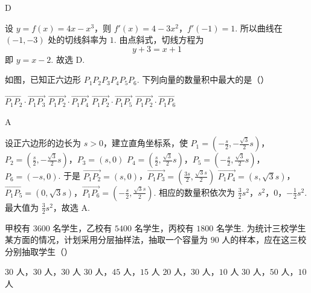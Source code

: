 \begin{answer}
D
\end{answer}

\begin{solution}
设 \(y=f(x)=4x-x^3\)，则
\(f'(x)=4-3x^2\)，\(f'(-1)=1\).
所以曲线在 \((-1,-3)\) 处的切线斜率为 \(1\). 由点斜式，切线方程为
\[
y+3=x+1
\]
即 \(y=x-2\). 故选 D.
\end{solution}

\begin{problem}
如图，已知正六边形 \(P_{1}P_{2}P_{3}P_{4}P_{5}P_{6}\). 下列向量的数量积中最大的是（\quad）


\choices
    {\(\overrightarrow{P_1P_2} \cdot \overrightarrow{P_1P_3}\)}
    {\(\overrightarrow{P_1P_2} \cdot \overrightarrow{P_1P_4}\)}
    {\(\overrightarrow{P_1P_2} \cdot \overrightarrow{P_1P_5}\)}
    {\(\overrightarrow{P_1P_2} \cdot \overrightarrow{P_1P_6}\)}
\end{problem}

\begin{answer}
A
\end{answer}

\begin{solution}
设正六边形的边长为 \(s>0\)，建立直角坐标系，使
\(P_1=\left(-\frac{s}{2},-\frac{\sqrt{3}}{2}s\right)\)，\(P_2=\left(\frac{s}{2},-\frac{\sqrt{3}}{2}s\right)\)，\(P_3=(s,0)\)
\(P_4=\left(\frac{s}{2},\frac{\sqrt{3}}{2}s\right)\)，\(P_5=\left(-\frac{s}{2},\frac{\sqrt{3}}{2}s\right)\)，\(P_6=(-s,0)\).
于是
\(\overrightarrow{P_1P_2}=(s,0)\)，\(\overrightarrow{P_1P_3}=\left(\frac{3s}{2},\frac{\sqrt{3}s}{2}\right)\)
\(\overrightarrow{P_1P_4}=(s,\sqrt{3}s)\)，\(\overrightarrow{P_1P_5}=(0,\sqrt{3}s)\)，\(\overrightarrow{P_1P_6}=\left(-\frac{s}{2},\frac{\sqrt{3}s}{2}\right)\).
相应的数量积依次为
\(\frac{3}{2}s^2\)，\(s^2\)，\(0\)，\(-\frac{1}{2}s^2\).
最大值为 \(\frac{3}{2}s^2\)，故选 A.
\end{solution}

\begin{problem}
甲校有 \(3600\) 名学生，乙校有 \(5400\) 名学生，丙校有 \(1800\) 名学生. 为统计三校学生某方面的情况，计划采用分层抽样法，抽取一个容量为 \(90\) 人的样本，应在这三校分别抽取学生（\quad）

\choices
    {\(30\) 人，\(30\) 人，\(30\) 人}
    {\(30\) 人，\(45\) 人，\(15\) 人}
    {\(20\) 人，\(30\) 人，\(10\) 人}
    {\(30\) 人，\(50\) 人，\(10\) 人}
\end{problem}

